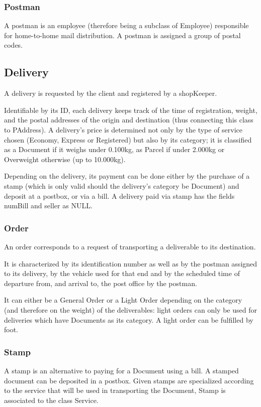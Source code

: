 \documentclass{report}[a4paper]
\theoremstyle{remark}
\begin{document}
\subsubsection{Postman}
A postman is an employee (therefore being a subclass of Employee) responsible for home-to-home mail distribution. A postman is assigned a group of postal codes.
\subsection{Delivery}
A delivery is requested by the client and registered by a shopKeeper. \par
Identifiable by its ID, each delivery keeps track of the time of registration, weight, and the postal addresses of the origin and destination (thus connecting this class to PAddress). A delivery’s price is determined not only by the type of service chosen (Economy, Express or Registered) but also by its category; it is classified as a Document if it weighs under 0.100kg, as Parcel if under 2.000kg or Overweight otherwise (up to 10.000kg).\par
Depending on the delivery, its payment can be done either by the purchase of a stamp (which is only valid should the delivery’s category be Document) and deposit at a postbox, or via a bill. A delivery paid via stamp has the fields numBill and seller as NULL.
\subsubsection{Order}
An order corresponds to a request of transporting a deliverable to its destination.\par
It is characterized by its identification number as well as by the postman assigned to its delivery, by the vehicle used for that end and by the scheduled time of departure from, and arrival to, the post office by the postman.\par
It can either be a General Order or a Light Order depending on the category (and therefore on the weight) of the deliverables: light orders can only be used for deliveries which have Documents as its category. A light order can be fulfilled by foot.
\subsubsection{Stamp}
A stamp is an alternative to paying for a Document using a bill. A stamped document can be deposited in a postbox. Given stamps are specialized according to the service that will be used in transporting the Document, Stamp is associated to the class Service.
\end{document}
